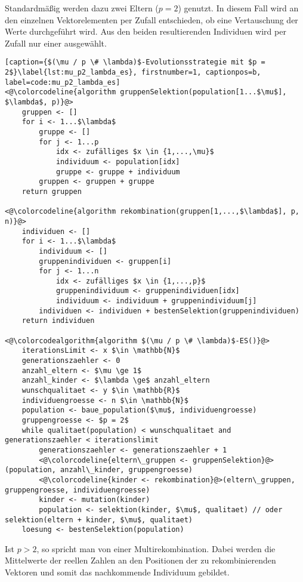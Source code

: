 Standardmäßig werden dazu zwei Eltern ($p = 2$) genutzt.
In diesem Fall wird an den einzelnen Vektorelementen per Zufall entschieden, ob eine Vertauschung der Werte durchgeführt wird.
Aus den beiden resultierenden Individuen wird per Zufall nur einer ausgewählt.

\begin{lstlisting}[caption={$(\mu / p \# \lambda)$-Evolutionsstrategie mit $p = 2$}\label{lst:mu_p2_lambda_es}, firstnumber=1, captionpos=b, label=code:mu_p2_lambda_es]
<@\colorcodeline{algorithm gruppenSelektion(population[1...$\mu$], $\lambda$, p)}@>
	gruppen <- []
	for i <- 1...$\lambda$
		gruppe <- []
		for j <- 1...p
			idx <- zufälliges $x \in {1,...,\mu}$
			individuum <- population[idx]
			gruppe <- gruppe + individuum
		gruppen <- gruppen + gruppe
	return gruppen

<@\colorcodeline{algorithm rekombination(gruppen[1,...,$\lambda$], p, n)}@>
	individuen <- []
	for i <- 1...$\lambda$
		individuum <- []
		gruppenindividuen <- gruppen[i]
		for j <- 1...n
			idx <- zufälliges $x \in {1,...,p}$
			gruppenindividuum <- gruppenindividuen[idx]
			individuum <- individuum + gruppenindividuum[j]
		individuen <- individuen + bestenSelektion(gruppenindividuen)
	return individuen

<@\colorcodealgorithm{algorithm $(\mu / p \# \lambda)$-ES()}@>
	iterationsLimit <- x $\in \mathbb{N}$
	generationszaehler <- 0
	anzahl_eltern <- $\mu \ge 1$
	anzahl_kinder <- $\lambda \ge$ anzahl_eltern
	wunschqualitaet <- y $\in \mathbb{R}$
	individuengroesse <- n $\in \mathbb{N}$
	population <- baue_population($\mu$, individuengroesse)
	gruppengroesse <- $p = 2$
	while qualitaet(population) < wunschqualitaet and generationszaehler < iterationslimit
		generationszaehler <- generationszaehler + 1
		<@\colorcodeline{eltern\_gruppen <- gruppenSelektion}@>(population, anzahl\_kinder, gruppengroesse)
		<@\colorcodeline{kinder <- rekombination}@>(eltern\_gruppen, gruppengroesse, individuengroesse)
		kinder <- mutation(kinder)
		population <- selektion(kinder, $\mu$, qualitaet) // oder selektion(eltern + kinder, $\mu$, qualitaet)
	loesung <- bestenSelektion(population)
\end{lstlisting}


Ist $p > 2$, so spricht man von einer Multirekombination.
Dabei werden die Mittelwerte der reellen Zahlen an den Positionen der zu rekombinierenden Vektoren und somit das nachkommende Individuum gebildet.

